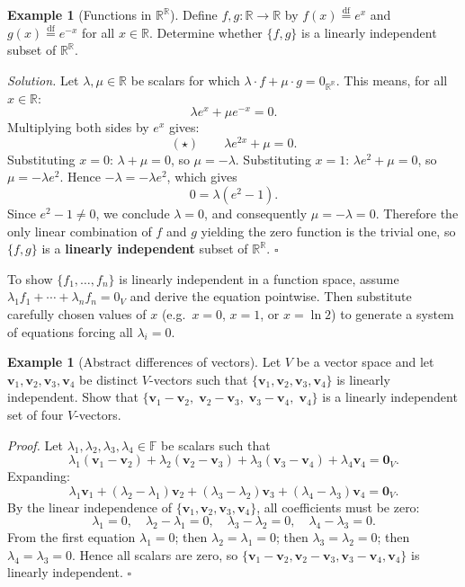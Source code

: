 \documentclass[11pt, a4paper, notitlepage]{report}
\theoremstyle{definition}
\newtheorem{example}[theorem]{Example}
\theoremstyle{remark}
\begin{document}
\begin{example}[Functions in $\mathbb{R}^\mathbb{R}$]\label{ex:exp-li}
Define $f, g : \mathbb{R}\to\mathbb{R}$ by $f(x) \stackrel{\mathrm{df}}{=} e^x$ and $g(x) \stackrel{\mathrm{df}}{=} e^{-x}$ for all $x\in\mathbb{R}$. Determine whether $\{f, g\}$ is a linearly independent subset of $\mathbb{R}^\mathbb{R}$.

\emph{Solution.} Let $\lambda, \mu\in\mathbb{R}$ be scalars for which $\lambda\cdot f + \mu\cdot g = 0_{\mathbb{R}^\mathbb{R}}$. This means, for all $x\in\mathbb{R}$:
\[
  \lambda e^x + \mu e^{-x} = 0.
\]
Multiplying both sides by $e^x$ gives:
\[
  (\star)\qquad \lambda e^{2x} + \mu = 0.
\]
Substituting $x=0$: $\lambda + \mu = 0$, so $\mu = -\lambda$. Substituting $x=1$: $\lambda e^2 + \mu = 0$, so $\mu = -\lambda e^2$. Hence $-\lambda = -\lambda e^2$, which gives
\[
  0 = \lambda(e^2 - 1).
\]
Since $e^2 - 1 \neq 0$, we conclude $\lambda = 0$, and consequently $\mu = -\lambda = 0$. Therefore the only linear combination of $f$ and $g$ yielding the zero function is the trivial one, so $\{f, g\}$ is a \textbf{linearly independent} subset of $\mathbb{R}^\mathbb{R}$. $\square$
\end{example}

\begin{examtip}[title={Exam Tip: Testing Linear Independence of Functions}]
To show $\{f_1, \ldots, f_n\}$ is linearly independent in a function space, assume $\lambda_1 f_1 + \cdots + \lambda_n f_n = 0_V$ and derive the equation pointwise. Then substitute carefully chosen values of $x$ (e.g.\ $x=0$, $x=1$, or $x=\ln 2$) to generate a system of equations forcing all $\lambda_i = 0$.
\end{examtip}

\begin{example}[Abstract differences of vectors]\label{ex:abstract-li}
Let $V$ be a vector space and let $\mathbf{v}_1, \mathbf{v}_2, \mathbf{v}_3, \mathbf{v}_4$ be distinct $V$-vectors such that $\{\mathbf{v}_1, \mathbf{v}_2, \mathbf{v}_3, \mathbf{v}_4\}$ is linearly independent. Show that $\{\mathbf{v}_1-\mathbf{v}_2,\; \mathbf{v}_2-\mathbf{v}_3,\; \mathbf{v}_3-\mathbf{v}_4,\; \mathbf{v}_4\}$ is a linearly independent set of four $V$-vectors.

\emph{Proof.} Let $\lambda_1, \lambda_2, \lambda_3, \lambda_4\in\mathbb{F}$ be scalars such that
\[
  \lambda_1(\mathbf{v}_1-\mathbf{v}_2) + \lambda_2(\mathbf{v}_2-\mathbf{v}_3) + \lambda_3(\mathbf{v}_3-\mathbf{v}_4) + \lambda_4\mathbf{v}_4 = \mathbf{0}_V.
\]
Expanding:
\[
  \lambda_1\mathbf{v}_1 + (\lambda_2-\lambda_1)\mathbf{v}_2 + (\lambda_3-\lambda_2)\mathbf{v}_3 + (\lambda_4-\lambda_3)\mathbf{v}_4 = \mathbf{0}_V.
\]
By the linear independence of $\{\mathbf{v}_1, \mathbf{v}_2, \mathbf{v}_3, \mathbf{v}_4\}$, all coefficients must be zero:
\[
  \lambda_1 = 0,\quad \lambda_2 - \lambda_1 = 0,\quad \lambda_3 - \lambda_2 = 0,\quad \lambda_4 - \lambda_3 = 0.
\]
From the first equation $\lambda_1=0$; then $\lambda_2=\lambda_1=0$; then $\lambda_3=\lambda_2=0$; then $\lambda_4=\lambda_3=0$. Hence all scalars are zero, so $\{\mathbf{v}_1-\mathbf{v}_2, \mathbf{v}_2-\mathbf{v}_3, \mathbf{v}_3-\mathbf{v}_4, \mathbf{v}_4\}$ is linearly independent. $\square$
\end{example}
\end{document}
